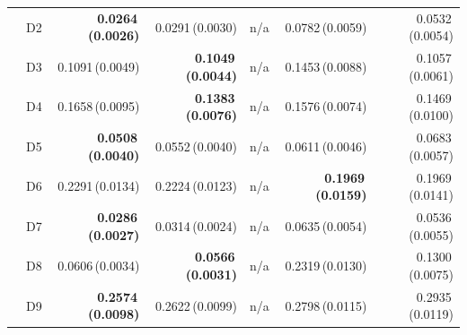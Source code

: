 \begin{table}[htbp]
\begin{tabular}{@{}llrrrrr@{}}
 & D2 & \textbf{0.0264\,(0.0026)} & 0.0291\,(0.0030) & n/a & 0.0782\,(0.0059) & 0.0532\,(0.0054) \\
 & D3 & 0.1091\,(0.0049) & \textbf{0.1049\,(0.0044)} & n/a & 0.1453\,(0.0088) & 0.1057\,(0.0061) \\
 & D4 & 0.1658\,(0.0095) & \textbf{0.1383\,(0.0076)} & n/a & 0.1576\,(0.0074) & 0.1469\,(0.0100) \\
 & D5 & \textbf{0.0508\,(0.0040)} & 0.0552\,(0.0040) & n/a & 0.0611\,(0.0046) & 0.0683\,(0.0057) \\
 & D6 & 0.2291\,(0.0134) & 0.2224\,(0.0123) & n/a & \textbf{0.1969\,(0.0159)} & 0.1969\,(0.0141) \\
 & D7 & \textbf{0.0286\,(0.0027)} & 0.0314\,(0.0024) & n/a & 0.0635\,(0.0054) & 0.0536\,(0.0055) \\
 & D8 & 0.0606\,(0.0034) & \textbf{0.0566\,(0.0031)} & n/a & 0.2319\,(0.0130) & 0.1300\,(0.0075) \\
 & D9 & \textbf{0.2574\,(0.0098)} & 0.2622\,(0.0099) & n/a & 0.2798\,(0.0115) & 0.2935\,(0.0119) \\
\bottomrule
\end{tabular}
\end{table}

